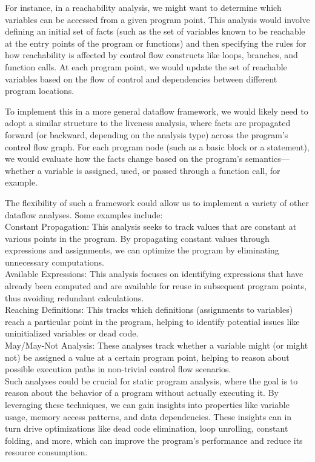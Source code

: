 \documentclass{article}
\begin{document}
For instance, in a reachability analysis, we might want to determine which variables can be accessed from a given program point. This analysis would involve defining an initial set of facts (such as the set of variables known to be reachable at the entry points of the program or functions) and then specifying the rules for how reachability is affected by control flow constructs like loops, branches, and function calls. At each program point, we would update the set of reachable variables based on the flow of control and dependencies between different program locations.

To implement this in a more general dataflow framework, we would likely need to adopt a similar structure to the liveness analysis, where facts are propagated forward (or backward, depending on the analysis type) across the program’s control flow graph. For each program node (such as a basic block or a statement), we would evaluate how the facts change based on the program's semantics—whether a variable is assigned, used, or passed through a function call, for example.

The flexibility of such a framework could allow us to implement a variety of other dataflow analyses. Some examples include: \\

\noindent Constant Propagation: This analysis seeks to track values that are constant at various points in the program. By propagating constant values through expressions and assignments, we can optimize the program by eliminating unnecessary computations. \\

\noindent Available Expressions: This analysis focuses on identifying expressions that have already been computed and are available for reuse in subsequent program points, thus avoiding redundant calculations. \\

\noindent Reaching Definitions: This tracks which definitions (assignments to variables) reach a particular point in the program, helping to identify potential issues like uninitialized variables or dead code. \\

\noindent May/May-Not Analysis: These analyses track whether a variable might (or might not) be assigned a value at a certain program point, helping to reason about possible execution paths in non-trivial control flow scenarios. \\


Such analyses could be crucial for static program analysis, where the goal is to reason about the behavior of a program without actually executing it. By leveraging these techniques, we can gain insights into properties like variable usage, memory access patterns, and data dependencies. These insights can in turn drive optimizations like dead code elimination, loop unrolling, constant folding, and more, which can improve the program's performance and reduce its resource consumption.
\end{document}
